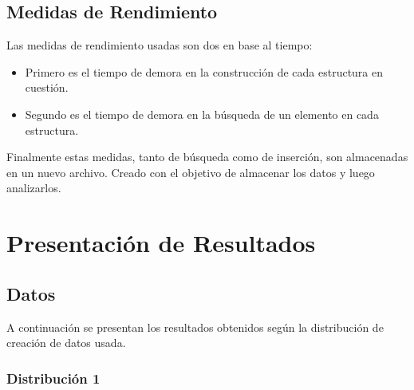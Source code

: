 \documentclass[letterpaper,12pt]{article}
\begin{document}
\subsection{Medidas de Rendimiento}
Las medidas de rendimiento usadas son dos en base al tiempo:
\begin{itemize}

\item Primero es el tiempo de demora en la construcción de cada estructura en cuestión.
	
\item Segundo es el tiempo de demora en la búsqueda de un elemento en cada estructura.

\end{itemize}

Finalmente estas medidas, tanto de búsqueda como de inserción, son almacenadas en un nuevo archivo. Creado con el objetivo de almacenar los datos y luego analizarlos.

\newpage
\section{Presentación de Resultados}

\subsection{Datos}
A continuación se presentan los resultados obtenidos según la distribución de creación de datos usada.

\subsubsection{Distribución 1}
\end{document}
